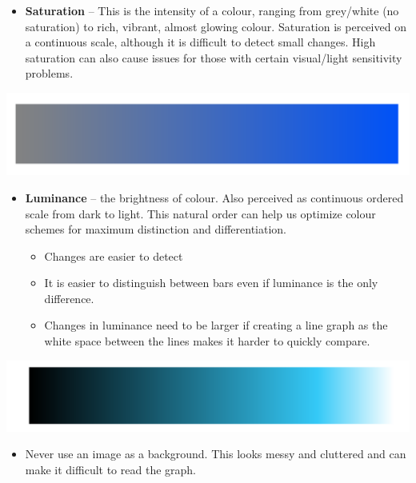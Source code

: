 \documentclass[
]{book}
\providecommand{\tightlist}{%
  \setlength{\itemsep}{0pt}\setlength{\parskip}{0pt}}
\begin{document}
\begin{itemize}
\tightlist
\item
  \textbf{Saturation} -- This is the intensity of a colour, ranging from grey/white (no saturation) to rich, vibrant, almost glowing colour. Saturation is perceived on a continuous scale, although it is difficult to detect small changes. High saturation can also cause issues for those with certain visual/light sensitivity problems.
\end{itemize}

\includegraphics[width=1\linewidth]{img/visegs/egsat}

\begin{itemize}
\tightlist
\item
  \textbf{Luminance} -- the brightness of colour. Also perceived as continuous ordered scale from dark to light. This natural order can help us optimize colour schemes for maximum distinction and differentiation.

  \begin{itemize}
  \tightlist
  \item
    Changes are easier to detect
  \item
    It is easier to distinguish between bars even if luminance is the only difference.
  \item
    Changes in luminance need to be larger if creating a line graph as the white space between the lines makes it harder to quickly compare.
  \end{itemize}
\end{itemize}

\includegraphics[width=1\linewidth]{img/visegs/eglum}

\begin{itemize}
\tightlist
\item
  Never use an image as a background. This looks messy and cluttered and can make it difficult to read the graph.
\end{itemize}
\end{document}
